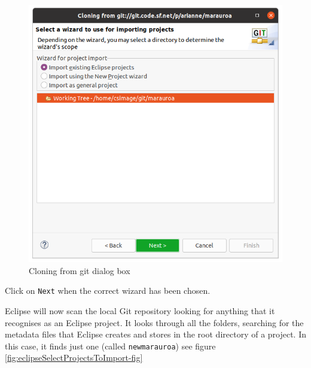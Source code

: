 \documentclass[
]{book}
\begin{document}
\begin{figure}

{\centering \includegraphics[width=1\linewidth]{images/1.4wizardImport} 

}

\caption{Cloning from git dialog box}\label{fig:wizardImport-fig}
\end{figure}

Click on \texttt{Next} when the correct wizard has been chosen.

Eclipse will now scan the local Git repository looking for anything that it recognises as an Eclipse project. It looks through all the folders, searching for the metadata files that Eclipse creates and stores in the root directory of a project. In this case, it finds just one (called \texttt{newmarauroa}) see figure \ref{fig:eclipseSelectProjectsToImport-fig}
\end{document}
